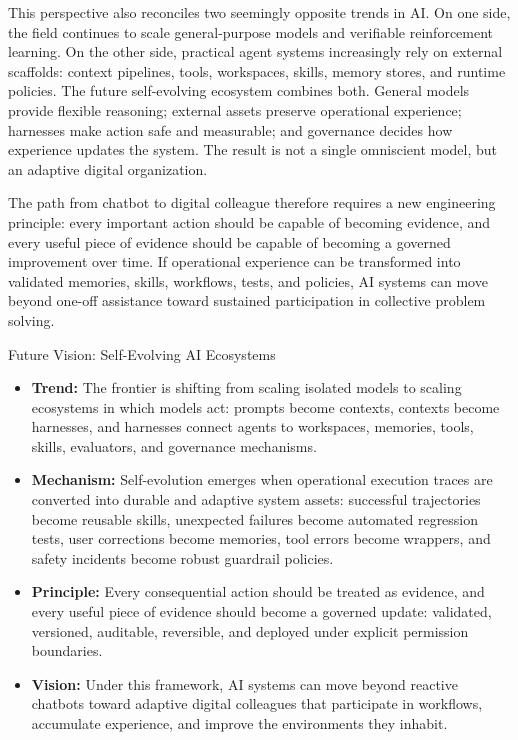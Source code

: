 This perspective also reconciles two seemingly opposite trends in AI. On one side, the field continues to scale general-purpose models and verifiable reinforcement learning. On the other side, practical agent systems increasingly rely on external scaffolds: context pipelines, tools, workspaces, skills, memory stores, and runtime policies. The future self-evolving ecosystem combines both. General models provide flexible reasoning; external assets preserve operational experience; harnesses make action safe and measurable; and governance decides how experience updates the system. The result is not a single omniscient model, but an adaptive digital organization.

The path from chatbot to digital colleague therefore requires a new engineering principle: every important action should be capable of becoming evidence, and every useful piece of evidence should be capable of becoming a governed improvement over time. If operational experience can be transformed into validated memories, skills, workflows, tests, and policies, AI systems can move beyond one-off assistance toward sustained participation in collective problem solving.

\begin{AIbox}{Future Vision: Self-Evolving AI Ecosystems}
    \begin{itemize}[left=2pt,topsep=1pt,itemsep=2pt, parsep=1pt]
        \item \textbf{Trend:} The frontier is shifting from scaling isolated models to scaling ecosystems in which models act: prompts become contexts, contexts become harnesses, and harnesses connect agents to workspaces, memories, tools, skills, evaluators, and governance mechanisms.

        \item \textbf{Mechanism:} Self-evolution emerges when operational execution traces are converted into durable and adaptive system assets: successful trajectories become reusable skills, unexpected failures become automated regression tests, user corrections become memories, tool errors become wrappers, and safety incidents become robust guardrail policies.

        \item \textbf{Principle:} Every consequential action should be treated as evidence, and every useful piece of evidence should become a governed update: validated, versioned, auditable, reversible, and deployed under explicit permission boundaries.

        \item \textbf{Vision:} Under this framework, AI systems can move beyond reactive chatbots toward adaptive digital colleagues that participate in workflows, accumulate experience, and improve the environments they inhabit.
    \end{itemize}
\end{AIbox}

